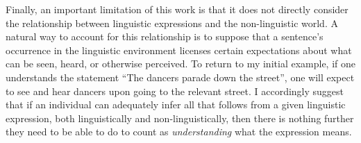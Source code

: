 Finally, an important limitation of this work is that it does not directly consider the relationship between linguistic expressions and the non-linguistic world. A natural way to account for this relationship is to suppose that a sentence's occurrence in the linguistic environment licenses certain expectations about what can be seen, heard, or otherwise perceived. To return to my initial example, if one understands the statement ``The dancers parade down the street'', one will expect to see and hear dancers upon going to the relevant street. I accordingly suggest that if an individual can adequately infer all that follows from a given linguistic expression, both linguistically and non-linguistically, then there is nothing further they need to be able to do to count as \textit{understanding} what the expression means.

